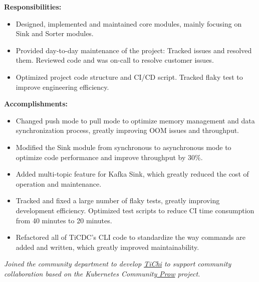 \documentclass{resume}
\newcommand{\en}[1]{#1}
\newcommand{\zh}[1]{}
\begin{document}
\en{\textbf{Responsibilities:}}
\zh{\textbf{职责：}}
\begin{itemize}
      \item \en{Designed, implemented and maintained core modules, mainly focusing on Sink and Sorter modules.}
            \zh{设计、实现和维护核心模块，主要聚焦于 Sink 和 Sorter 模块。}
      \item \en{Provided day-to-day maintenance of the project: Tracked issues and resolved them. Reviewed code and was on-call to resolve customer issues.}
            \zh{项目日常的维护：Issues 追踪和解决、代码审阅和 on-call 解决客户问题。}
      \item \en{Optimized project code structure and CI/CD script. Tracked flaky test to improve engineering efficiency.}
            \zh{优化项目代码结构、追踪不稳定测试，优化 CI/CD 脚本，提升工程效率。}
\end{itemize}

\en{\textbf{Accomplishments:}}
\zh{\textbf{产出：}}
\begin{itemize}
      \item \en{Changed push mode to pull mode to optimize memory management and data synchronization process, greatly improving OOM issues and throughput.}
            \zh{将推送模式修改为了拉取模式优化了内存管理和数据同步流程，极大的改善了 OOM 问题和吞吐。}
      \item \en{Modified the Sink module from synchronous to asynchronous mode to optimize code performance and improve throughput by 30\%.}
            \zh{将 Sink 模块从同步模式修改为异步模式，优化代码性能，将吞吐提升 30\%。}
      \item \en{ Added multi-topic feature for Kafka Sink, which greatly reduced the cost of operation and maintenance.}
            \zh{为 Kafka Sink 支持了多 Topic 功能，极大的降低了多 Topic 的任务运维成本。}
      \item \en{Tracked and fixed a large number of flaky tests, greatly improving development efficiency. Optimized test scripts to reduce CI time consumption from 40 minutes to 20 minutes.}
            \zh{追踪和修复大量不稳定测试，极大的提升了开发效率。优化了测试脚本，将 CI 时间消耗从 40 分钟降低至 20 分钟。}
      \item \en{Refactored all of TiCDC’s CLI code to standardize the way commands are added and written, which greatly improved maintainability.}
            \zh{重构了 TiCDC 的 CLI 所有代码，标准化了命令添加和编写方式，极大提升了可维护性。}
\end{itemize}
\en{}
\zh{\datedsubsection{\textbf{\href{https://pingcap.com/zh/}{PingCAP Inc. - 数据库 - 前后端开发工程师}}}{2020/08 -- 2021/07}}
\en{\textsl{Joined the community department to develop {\href{https://github.com/ti-community-infra/tichi}{TiChi}} to support community collaboration based on the Kubernetes Community{\href{https://github.com/kubernetes/test-infra/tree/master/prow}{ Prow}} project.}}
\zh{\textsl{加入了社区部门，以 Kubernetes 社区{\href{https://github.com/kubernetes/test-infra/tree/master/prow}{ Prow}} 项目为基础开发{\href{https://github.com/ti-community-infra/tichi}{ TiChi}} 来支撑社区协作。}}
\end{document}
